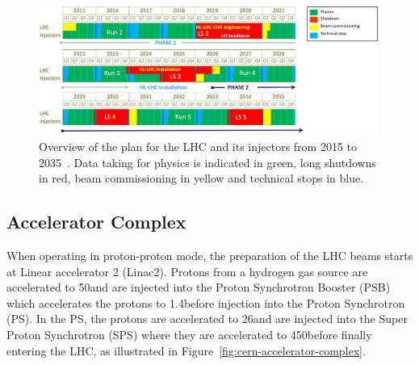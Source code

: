\begin{figure}[htb]
\begin{center}
\vspace*{5mm}\includegraphics[width=0.99\textwidth]{figs/lhc/LHC-Planning.jpg}
\caption{Overview of the plan for the LHC and its injectors from 2015 to 2035~\cite{P2TrackerTDR}. Data taking for physics is indicated in green, long shutdowns in red, beam commissioning in yellow and technical stops in blue.}
\label{fig:lhc-planning}
\end{center}
\end{figure}

\subsection{Accelerator Complex}\label{subsec:acceleratorComplex}
When operating in proton-proton mode, the preparation of the LHC beams starts at Linear accelerator 2 (Linac2). 
Protons from a hydrogen gas source are accelerated to 50\MeV and are injected into the Proton Synchrotron Booster (PSB) which accelerates the protons to 1.4\GeV before injection into the Proton Synchrotron (PS). 
In the PS, the protons are accelerated to 26\GeV and are injected into the Super Proton Synchrotron (SPS) where they are accelerated to 450\GeV before finally entering the LHC, as illustrated in Figure~\ref{fig:cern-accelerator-complex}. 

